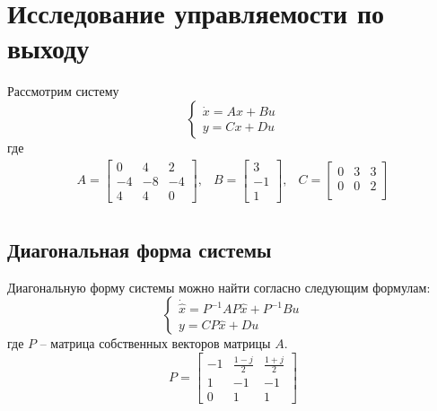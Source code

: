 \section{Исследование управляемости по выходу}
Рассмотрим систему 
\begin{equation}
    \begin{cases}
        \dot{x} = Ax + Bu \\
        y = Cx + Du 
    \end{cases}
\end{equation}
где 
\begin{equation}
    \begin{array}{ccc}
        A = \begin{bmatrix}
            0 & 4 & 2 \\
            -4 & -8 & -4 \\
            4 & 4 & 0
        \end{bmatrix}, &
        B = \begin{bmatrix}
            3 \\
            -1 \\
            1
        \end{bmatrix}, &
        C = \begin{bmatrix}
            0 & 3 & 3  \\ 
            0 & 0 & 2 \\
        \end{bmatrix} \\
    \end{array}
\end{equation}


\subsection{Диагональная форма системы}
Диагональную форму системы можно найти согласно следующим формулам:
\begin{equation}
    \begin{cases}
        \dot{\hat{x}} = P^{-1}AP\hat{x} + P^{-1}Bu \\ 
        y = CP\hat{x} + Du
    \end{cases} 
\end{equation}
где $P$ -- матрица собственных векторов матрицы $A$.
\begin{equation}
    P = \begin{bmatrix}
        -1 & \frac{1-j}{2} & \frac{1+j}{2} \\
        1 & -1 & -1 \\
        0 & 1 & 1
    \end{bmatrix}
\end{equation}

